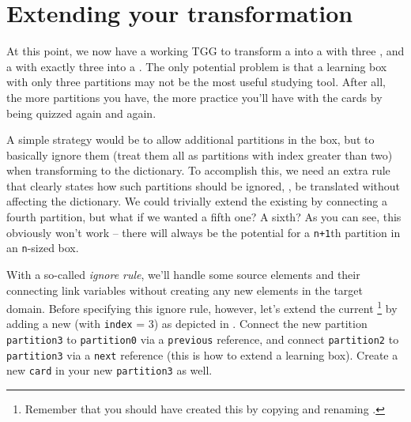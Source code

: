 \chapter{Extending your transformation}
\genHeader

At this point, we now have a working TGG to transform a  into a  with three , and a  with exactly three  into a . 
The only potential problem is that a learning box with only three partitions may not be the most useful studying tool. 
After all, the more partitions you have, the more practice you'll have with the cards by being quizzed again and again.

A simple strategy would be to allow additional partitions in the box, but to basically ignore them (treat them all as partitions with index greater than two) when transforming to the dictionary. 
To accomplish this, we need an extra rule that clearly states how such partitions should be ignored, \idest, be translated without affecting the dictionary. 
We could trivially extend the existing  by connecting a fourth partition, but what if we wanted a fifth one? A sixth? As you can see, this obviously won't work -- there will always be the potential for a \texttt{n+1}th partition in an \texttt{n}-sized box. 

With a so-called \emph{ignore rule}, we'll handle some source elements and their connecting link variables without creating any new elements in the target domain.
%
Before specifying this ignore rule, however, let's extend the current \footnote{Remember that you should have created this by copying and renaming .} by adding a new  (with \texttt{index} = 3) as depicted in .
Connect the new partition \texttt{partition3}  to \texttt{partition0} via a \texttt{previous} reference, and connect \texttt{partition2} to \texttt{partition3} via a \texttt{next} reference (this is how to extend a learning box).
Create a new \texttt{card} in your new \texttt{partition3} as well.

